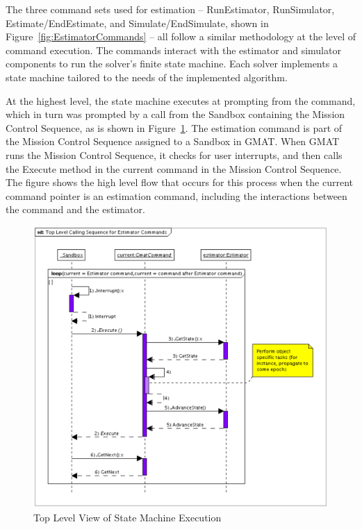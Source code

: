 The three command sets used for estimation -- RunEstimator, RunSimulator, Estimate/EndEstimate, and Simulate/EndSimulate, shown in Figure~\ref{fig:EstimatorCommands} -- all follow a similar methodology at the level of command execution. The commands interact with the estimator and simulator components to run the solver's finite state machine.  Each solver implements a state machine tailored to the needs of the implemented algorithm.

At the highest level, the state machine executes at prompting from the command, which in turn was prompted by a call from the Sandbox containing the Mission Control Sequence, as is shown in Figure~\ref{fig:EstimatorCommandCallSeq}. The estimation command is part of the Mission Control Sequence assigned to a Sandbox in GMAT.  When GMAT runs the Mission Control Sequence, it checks for user interrupts, and then calls the Execute method in the current command in the Mission Control Sequence.  The figure shows the high level flow that occurs for this process when the current command pointer is an estimation command, including the interactions between the command and the estimator.

\begin{figure}[htb]
\begin{center}
\includegraphics[scale=0.5]{Images/TopLevelCallingSequenceforEstimatorCommands.eps}
\caption{\label{fig:EstimatorCommandCallSeq}Top Level View of State Machine Execution}
\end{center}
\end{figure}

